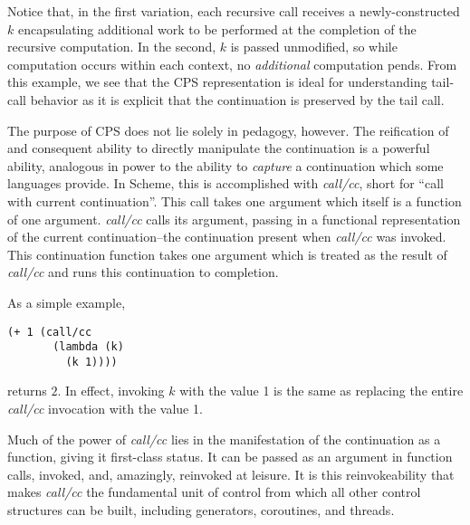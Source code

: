 \documentclass[11pt,ms]{byuprop}
\newcounter{example}
\begin{document}
Notice that, in the first variation, each recursive call receives a newly-constructed 
$k$ encapsulating additional work to be performed at the completion of the recursive 
computation. In the second, $k$ is passed unmodified, so while computation occurs 
within each context, no \emph{additional} computation pends. From this example, we 
see that the CPS representation is ideal for understanding tail-call behavior as it 
is explicit that the continuation is preserved by the tail call.

The purpose of CPS does not lie solely in pedagogy, however. The reification of and 
consequent ability to directly manipulate the continuation is a powerful ability, 
analogous in power to the ability to \emph{capture} a continuation which some 
languages provide. In Scheme, this is accomplished with \emph{call/cc}, short for 
``call with current continuation''. This call takes one argument which itself is a 
function of one argument. \emph{call/cc} calls its argument, passing in a functional 
representation of the current continuation--the continuation present when \emph{call/cc} 
was invoked. This continuation function takes one argument which is treated as the result 
of \emph{call/cc} and runs this continuation to completion.

As a simple example,
\begin{verbatim}
(+ 1 (call/cc
       (lambda (k)
         (k 1))))
\end{verbatim}
returns $2$. In effect, invoking $k$ with the value 1 is the same as replacing 
the entire \emph{call/cc} invocation with the value 1.

Much of the power of \emph{call/cc} lies in the manifestation of the continuation 
as a function, giving it first-class status. It can be passed as an argument in 
function calls, invoked, and, amazingly, reinvoked at leisure. It is this 
reinvokeability that makes \emph{call/cc} the fundamental unit of control from 
which all other control structures can be built, including generators, coroutines, 
and threads.

\end{document}
